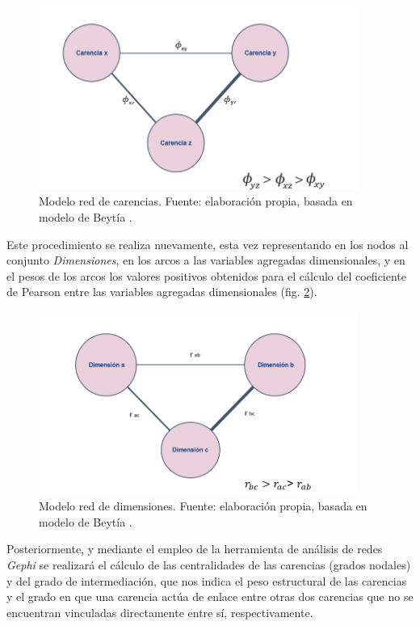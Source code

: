 \documentclass[12pt,letterpaper,spanish]{article}
\begin{document}
\begin{enumerate}
\begin{figure}[H]
    \centering
    \includegraphics[height=6cm]{Max/redes_phi.png}
    \caption{Modelo red de carencias. Fuente: elaboración propia, basada en modelo de Beytía \cite{Beytia2016PobrezaChile}.}
    \label{modelo_red_carencias}
\end{figure}

Este procedimiento se realiza nuevamente, esta vez representando en los nodos al conjunto \textit{Dimensiones}, en los arcos a las variables agregadas dimensionales, y en el pesos de los arcos los valores positivos obtenidos para el cálculo del coeficiente de Pearson entre las variables agregadas dimensionales (fig. \ref{modelo_red_dimensiones}).


\begin{figure}[H]
    \centering
    \includegraphics[height=6cm]{Max/redes_pearson.png}
    \caption{Modelo red de dimensiones. Fuente: elaboración propia, basada en modelo de Beytía \cite{Beytia2016PobrezaChile}.}
    \label{modelo_red_dimensiones}
\end{figure}

Posteriormente, y mediante el empleo de la herramienta de análisis de redes \textit{Gephi} se realizará el cálculo de las centralidades de las carencias (grados nodales) y del grado de intermediación, que nos indica el peso estructural de las carencias y el grado en que una carencia actúa de enlace entre otras dos carencias que no se encuentran vinculadas directamente entre sí, respectivamente. 

\end{enumerate}
\end{document}
